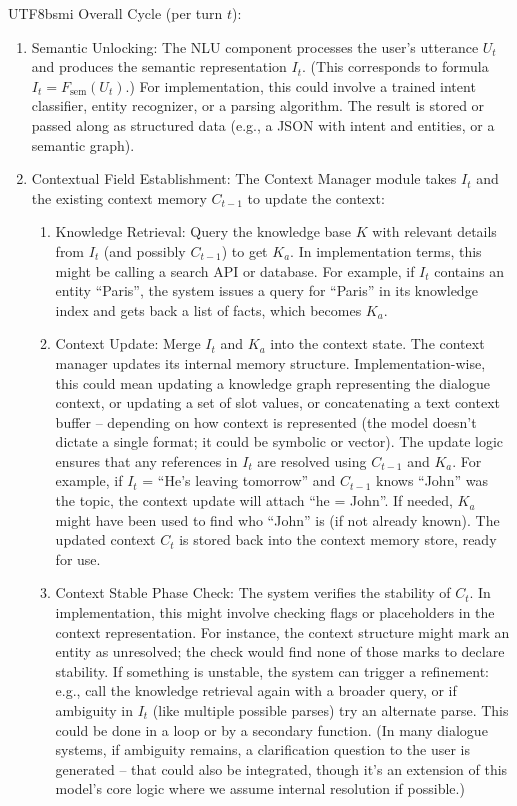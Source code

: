 \documentclass{article}
\begin{document}
\begin{CJK*}{UTF8}{bsmi}
Overall Cycle (per turn $t$):
\begin{enumerate}
    \item Semantic Unlocking: The NLU component processes the user’s utterance $U_t$ and produces the semantic representation $I_t$. (This corresponds to formula $I_t = F_{\text{sem}}(U_t)$.) For implementation, this could involve a trained intent classifier, entity recognizer, or a parsing algorithm. The result is stored or passed along as structured data (e.g., a JSON with intent and entities, or a semantic graph).
    \item Contextual Field Establishment: The Context Manager module takes $I_t$ and the existing context memory $C_{t-1}$ to update the context:
    \begin{enumerate}[label=(\alph*)]
        \item Knowledge Retrieval: Query the knowledge base $K$ with relevant details from $I_t$ (and possibly $C_{t-1}$) to get $K_a$. In implementation terms, this might be calling a search API or database. For example, if $I_t$ contains an entity “Paris”, the system issues a query for “Paris” in its knowledge index and gets back a list of facts, which becomes $K_a$.
        \item Context Update: Merge $I_t$ and $K_a$ into the context state. The context manager updates its internal memory structure. Implementation-wise, this could mean updating a knowledge graph representing the dialogue context, or updating a set of slot values, or concatenating a text context buffer – depending on how context is represented (the model doesn’t dictate a single format; it could be symbolic or vector). The update logic ensures that any references in $I_t$ are resolved using $C_{t-1}$ and $K_a$. For example, if $I_t$ = “He’s leaving tomorrow” and $C_{t-1}$ knows “John” was the topic, the context update will attach “he = John”. If needed, $K_a$ might have been used to find who “John” is (if not already known). The updated context $C_t$ is stored back into the context memory store, ready for use.
        \item Context Stable Phase Check: The system verifies the stability of $C_t$. In implementation, this might involve checking flags or placeholders in the context representation. For instance, the context structure might mark an entity as unresolved; the check would find none of those marks to declare stability. If something is unstable, the system can trigger a refinement: e.g., call the knowledge retrieval again with a broader query, or if ambiguity in $I_t$ (like multiple possible parses) try an alternate parse. This could be done in a loop or by a secondary function. (In many dialogue systems, if ambiguity remains, a clarification question to the user is generated – that could also be integrated, though it’s an extension of this model’s core logic where we assume internal resolution if possible.)

\end{enumerate}
\end{enumerate}
\end{CJK*}
\end{document}
